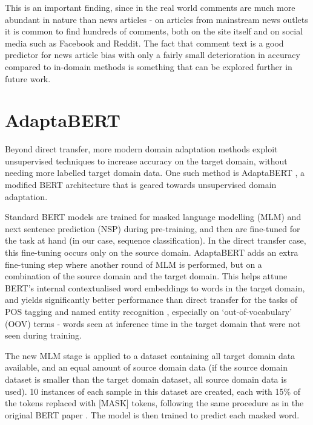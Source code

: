 This is an important finding, since in the real world comments are much more abundant in nature than news articles - on articles from mainstream news outlets it is common to find hundreds of comments, both on the site itself and on social media such as Facebook and Reddit. The fact that comment text is a good predictor for news article bias with only a fairly small deterioration in accuracy compared to in-domain methods is something that can be explored further in future work.

\section{AdaptaBERT} \label{sec:adaptabert}

Beyond direct transfer, more modern domain adaptation methods exploit unsupervised techniques to increase accuracy on the target domain, without needing more labelled target domain data. One such method is AdaptaBERT \cite{adaptabert}, a modified BERT architecture that is geared towards unsupervised domain adaptation.

Standard BERT models are trained for masked language modelling (MLM) and next sentence prediction (NSP) during pre-training, and then are fine-tuned for the task at hand (in our case, sequence classification). In the direct transfer case, this fine-tuning occurs only on the source domain. AdaptaBERT adds an extra fine-tuning step where another round of MLM is performed, but on a combination of the source domain and the target domain. This helps attune BERT's internal contextualised word embeddings to words in the target domain, and yields significantly better performance than direct transfer for the tasks of POS tagging and named entity recognition \cite{adaptabert}, especially on `out-of-vocabulary' (OOV) terms - words seen at inference time in the target domain that were not seen during training.

The new MLM stage is applied to a dataset containing all target domain data available, and an equal amount of source domain data (if the source domain dataset is smaller than the target domain dataset, all source domain data is used). 10 instances of each sample in this dataset are created, each with 15\% of the tokens replaced with [MASK] tokens, following the same procedure as in the original BERT paper \cite{bert}. The model is then trained to predict each masked word.

